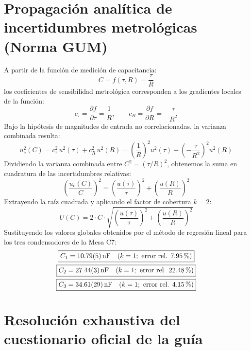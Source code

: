 \begin{appendices}
\section{Propagación analítica de incertidumbres metrológicas (Norma GUM)}
\label{sec:anexo_propagacion}

A partir de la función de medición de capacitancia:
\begin{equation}
    C = f(\tau, R) = \frac{\tau}{R}
\end{equation}
los coeficientes de sensibilidad metrológica corresponden a los gradientes locales de la función:
\begin{equation}
    c_\tau = \frac{\partial f}{\partial \tau} = \frac{1}{R}, \qquad c_R = \frac{\partial f}{\partial R} = -\frac{\tau}{R^2}
\end{equation}
Bajo la hipótesis de magnitudes de entrada no correlacionadas, la varianza combinada resulta:
\begin{equation}
    u_c^2(C) = c_\tau^2\,u^2(\tau) + c_R^2\,u^2(R) = \left( \frac{1}{R} \right)^2 u^2(\tau) + \left( -\frac{\tau}{R^2} \right)^2 u^2(R)
\end{equation}
Dividiendo la varianza combinada entre $C^2 = (\tau / R)^2$, obtenemos la suma en cuadratura de las incertidumbres relativas:
\begin{equation}
    \left( \frac{u_c(C)}{C} \right)^2 = \left( \frac{u(\tau)}{\tau} \right)^2 + \left( \frac{u(R)}{R} \right)^2
\end{equation}
Extrayendo la raíz cuadrada y aplicando el factor de cobertura $k=2$:
\begin{equation}
    \boxed{U(C) = 2 \cdot C \cdot \sqrt{\left(\frac{u(\tau)}{\tau}\right)^2 + \left(\frac{u(R)}{R}\right)^2}}
    \label{eq:anexo_gum_recuadro}
\end{equation}
Sustituyendo los valores globales obtenidos por el método de regresión lineal para los tres condensadores de la Mesa C7:
\begin{gather}
    \boxed{C_1 = \qty{10,79 \pm 0,05}{\nano\farad} \quad (k=1; \text{ error rel. } \qty{+7,95}{\percent})} \\
    \boxed{C_2 = \qty{27,44 \pm 0,03}{\nano\farad} \quad (k=1; \text{ error rel. } \qty{+22,48}{\percent})} \\
    \boxed{C_3 = \qty{34,61 \pm 0,29}{\nano\farad} \quad (k=1; \text{ error rel. } \qty{+4,15}{\percent})}
\end{gather}

\section{Resolución exhaustiva del cuestionario oficial de la guía}
\label{sec:anexo_cuestionario}


\end{appendices}
